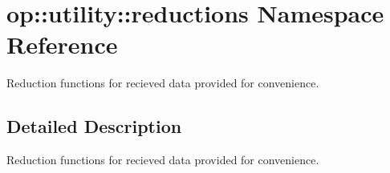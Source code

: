 \hypertarget{namespaceop_1_1utility_1_1reductions}{\section{op\-:\-:utility\-:\-:reductions Namespace Reference}
\label{namespaceop_1_1utility_1_1reductions}
}


Reduction functions for recieved data provided for convenience.  




\subsection{Detailed Description}
Reduction functions for recieved data provided for convenience. 